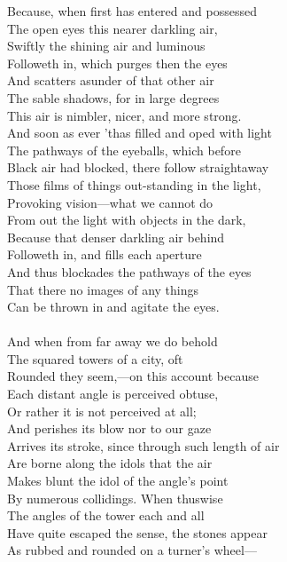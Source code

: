 Because, when first has entered and possessed\\
The open eyes this nearer darkling air,\\
Swiftly the shining air and luminous\\
Followeth in, which purges then the eyes\\
And scatters asunder of that other air\\
The sable shadows, for in large degrees\\
This air is nimbler, nicer, and more strong.\\
And soon as ever 'thas filled and oped with light\\
The pathways of the eyeballs, which before\\
Black air had blocked, there follow straightaway\\
Those films of things out-standing in the light,\\
Provoking vision—what we cannot do\\
From out the light with objects in the dark,\\
Because that denser darkling air behind\\
Followeth in, and fills each aperture\\
And thus blockades the pathways of the eyes\\
That there no images of any things\\
Can be thrown in and agitate the eyes.\\
\\
And when from far away we do behold\\
The squared towers of a city, oft\\
Rounded they seem,—on this account because\\
Each distant angle is perceived obtuse,\\
Or rather it is not perceived at all;\\
And perishes its blow nor to our gaze\\
Arrives its stroke, since through such length of air\\
Are borne along the idols that the air\\
Makes blunt the idol of the angle's point\\
By numerous collidings. When thuswise\\
The angles of the tower each and all\\
Have quite escaped the sense, the stones appear\\
As rubbed and rounded on a turner's wheel—\\
